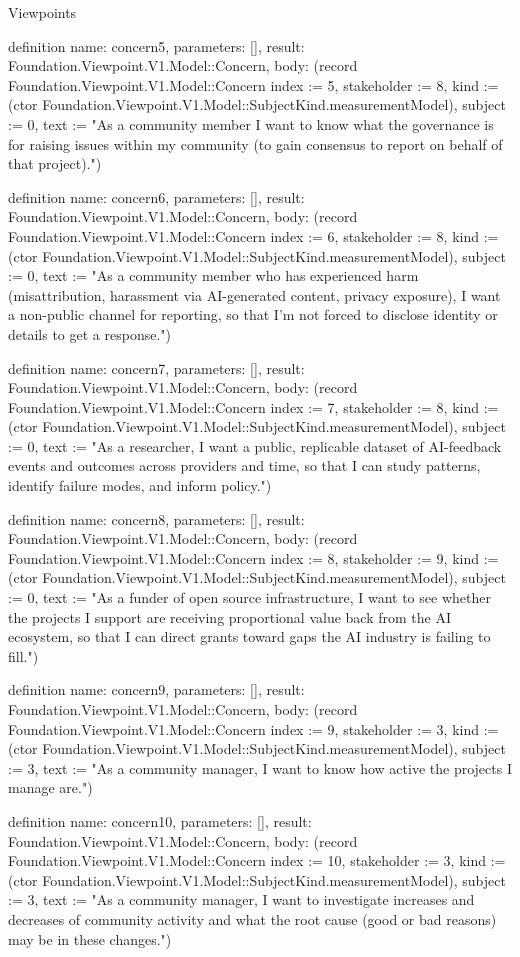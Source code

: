 \begin{lexlean}{Viewpoints}
\begin{semanticmodule}
definition{
  name: concern5,
  parameters: [],
  result: Foundation.Viewpoint.V1.Model::Concern,
  body: (record Foundation.Viewpoint.V1.Model::Concern {index := 5, stakeholder := 8, kind := (ctor Foundation.Viewpoint.V1.Model::SubjectKind.measurementModel), subject := 0, text := "As a community member I want to know what the governance is for raising issues within my community (to gain consensus to report on behalf of that project)."})
}

definition{
  name: concern6,
  parameters: [],
  result: Foundation.Viewpoint.V1.Model::Concern,
  body: (record Foundation.Viewpoint.V1.Model::Concern {index := 6, stakeholder := 8, kind := (ctor Foundation.Viewpoint.V1.Model::SubjectKind.measurementModel), subject := 0, text := "As a community member who has experienced harm (misattribution, harassment via AI-generated content, privacy exposure), I want a non-public channel for reporting, so that I'm not forced to disclose identity or details to get a response."})
}

definition{
  name: concern7,
  parameters: [],
  result: Foundation.Viewpoint.V1.Model::Concern,
  body: (record Foundation.Viewpoint.V1.Model::Concern {index := 7, stakeholder := 8, kind := (ctor Foundation.Viewpoint.V1.Model::SubjectKind.measurementModel), subject := 0, text := "As a researcher, I want a public, replicable dataset of AI-feedback events and outcomes across providers and time, so that I can study patterns, identify failure modes, and inform policy."})
}

definition{
  name: concern8,
  parameters: [],
  result: Foundation.Viewpoint.V1.Model::Concern,
  body: (record Foundation.Viewpoint.V1.Model::Concern {index := 8, stakeholder := 9, kind := (ctor Foundation.Viewpoint.V1.Model::SubjectKind.measurementModel), subject := 0, text := "As a funder of open source infrastructure, I want to see whether the projects I support are receiving proportional value back from the AI ecosystem, so that I can direct grants toward gaps the AI industry is failing to fill."})
}

definition{
  name: concern9,
  parameters: [],
  result: Foundation.Viewpoint.V1.Model::Concern,
  body: (record Foundation.Viewpoint.V1.Model::Concern {index := 9, stakeholder := 3, kind := (ctor Foundation.Viewpoint.V1.Model::SubjectKind.measurementModel), subject := 3, text := "As a community manager, I want to know how active the projects I manage are."})
}

definition{
  name: concern10,
  parameters: [],
  result: Foundation.Viewpoint.V1.Model::Concern,
  body: (record Foundation.Viewpoint.V1.Model::Concern {index := 10, stakeholder := 3, kind := (ctor Foundation.Viewpoint.V1.Model::SubjectKind.measurementModel), subject := 3, text := "As a community manager, I want to investigate increases and decreases of community activity and what the root cause (good or bad reasons) may be in these changes."})
}


\end{semanticmodule}
\end{lexlean}
